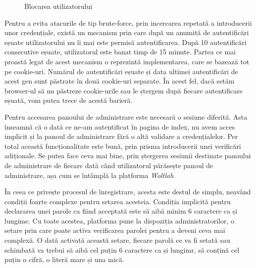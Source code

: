 \begin{figure}
    \vspace{-10pt}
    \vspace{-20pt}
    \caption{\label{fig:Policy-FailedAttempts} Blocarea utilizatorului}
    \vspace{-10pt}
\end{figure}

Pentru a evita atacurile de tip brute-force, prin incercarea repetată a introducerii unor credențiale, există un mecanism prin care după un anumită de autentificări eșuate utilizatorului nu îi mai este permisă autentificarea. După 10 autentificări consecutive eșuate, utilizatorul este banat timp de 15 minute. Partea ce mai proastă legat de acest mecanism o reprezintă implementarea, care se bazează tot pe cookie-uri. Numărul de autentificări eșuate și data ultimei autentificări de acest gen sunt păstrate în două cookie-uri separate. În acest fel, dacă setăm browser-ul să nu păstreze cookie-urile sau le ștergem după fiecare autentificare eșuată, vom putea trece de acestă barieră.

Pentru accesarea panoului de administrare este necesară o sesiune diferită. Asta înseamnă că o dată ce ne-am autentificat în pagina de index, nu avem acces implicit și la panoul de administrare fără o altă validare a credențialelor. Per total această funcționalitate este bună, prin prisma introducerii unei verificări adiționale. Se putea face ceva mai bine, prin ștergerea sesiunii destinate panoului de administrare de fiecare dată când utilizatorul părăsește panoul de administrare, așa cum se întâmplă la platforma \textit{Woltlab}.

În ceea ce privește procesul de înregistrare, acesta este destul de simplu, neavând condiții foarte complexe pentru setarea acesteia. Condiția implicită pentru declararea unei parole ca fiind acceptată este să aibă minim 6 caractere ca și lungime. Cu toate acestea, platforma pune la dispoziția administratorilor, o setare prin care poate activa verificarea parolei pentru a deveni ceva mai complexă. O dată activată această setare, fiecare parolă ce va fi setată sau schimbată va trebui să aibă cel puțin 6 caractere ca și lungimr, să conțină cel puțin o cifră, o literă mare și una mică.

